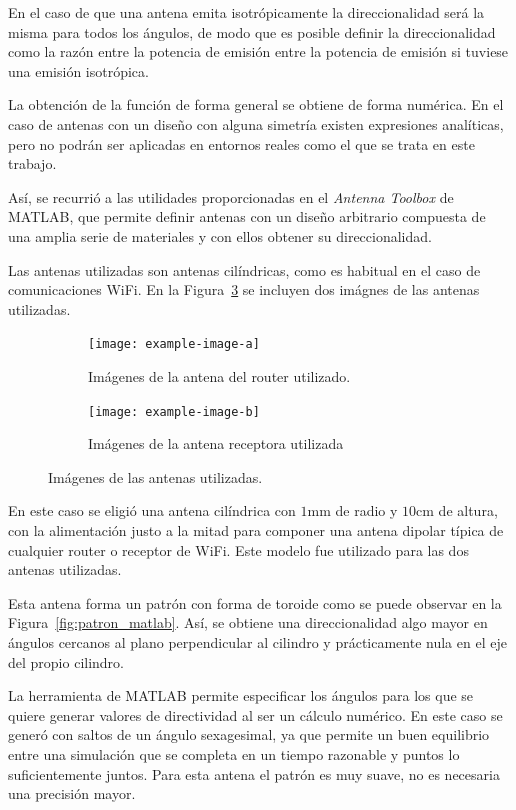 En el caso de que una antena emita isotrópicamente la direccionalidad será la misma para todos los ángulos, de modo que es posible definir la direccionalidad como la razón entre la potencia de emisión entre la potencia de emisión si tuviese una emisión isotrópica.

La obtención de la función de forma general se obtiene de forma numérica.
En el caso de antenas con un diseño con alguna simetría existen expresiones analíticas, pero no podrán ser aplicadas en entornos reales como el que se trata en este trabajo.

Así, se recurrió a las utilidades proporcionadas en el \textit{Antenna Toolbox} de MATLAB, que permite definir antenas con un diseño arbitrario compuesta de una amplia serie de materiales y con ellos obtener su direccionalidad.\cite{MATLAB}

Las antenas utilizadas son antenas cilíndricas, como es habitual en el caso de comunicaciones WiFi.
En la Figura~\ref{fig:antenas} se incluyen dos imágnes de las antenas utilizadas.

\begin{figure}[H]
    \centering
    \begin{subfigure}[b]{0.4\textwidth}
        \centering
        \texttt{[image: example-image-a]}
        \caption{Imágenes de la antena del router utilizado.}
        \label{fig:antena_router}
    \end{subfigure}
    \begin{subfigure}[b]{0.4\textwidth}
        \centering
        \texttt{[image: example-image-b]} 
        \caption{Imágenes de la antena receptora utilizada}
        \label{fig:antena_receptor}
    \end{subfigure}
    \caption{Imágenes de las antenas utilizadas.}
    \label{fig:antenas}
\end{figure}

En este caso se eligió una antena cilíndrica con $1\si{\milli\meter}$ de radio y $10\si{\centi\meter}$ de altura, con la alimentación justo a la mitad para componer una antena dipolar típica de cualquier router o receptor de WiFi.
Este modelo fue utilizado para las dos antenas utilizadas.

Esta antena forma un patrón con forma de toroide como se puede observar en la Figura~\ref{fig:patron_matlab}.
Así, se obtiene una direccionalidad algo mayor en ángulos cercanos al plano perpendicular al cilindro y prácticamente nula en el eje del propio cilindro.

La herramienta de MATLAB permite especificar los ángulos para los que se quiere generar valores de directividad al ser un cálculo numérico.
En este caso se generó con saltos de un ángulo sexagesimal, ya que permite un buen equilibrio entre una simulación que se completa en un tiempo razonable y puntos lo suficientemente juntos.
Para esta antena el patrón es muy suave, no es necesaria una precisión mayor.

